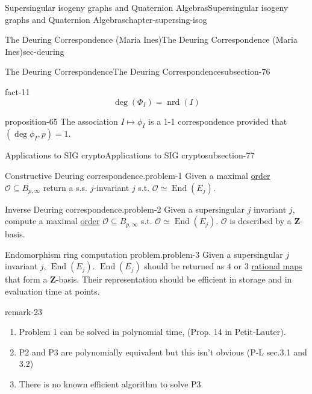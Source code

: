 \documentclass[oneside,10pt,]{book}
\numberwithin{equation}{section}
\newcommand{\ZZ}{\mathbf{Z}}
\newcommand{\ints}{\mathcal{O}}
\DeclareMathOperator{\End}{End}
\begin{document}
\begin{chapterptx}{Supersingular isogeny graphs and Quaternion Algebras}{}{Supersingular isogeny graphs and Quaternion Algebras}{}{}{chapter-supersing-isog}
\begin{sectionptx}{The Deuring Correspondence (Maria Ines)}{}{The Deuring Correspondence (Maria Ines)}{}{}{sec-deuring}
\begin{subsectionptx}{The Deuring Correspondence}{}{The Deuring Correspondence}{}{}{subsection-76}
\begin{fact}{}{}{fact-11}%
\hypertarget{p-970}{}%
%
\begin{equation*}
\deg (\Phi_I)  = \operatorname{nrd}(I)
\end{equation*}
%
\end{fact}
\begin{proposition}{}{}{proposition-65}%
\hypertarget{p-971}{}%
The association \(I \mapsto \phi_I\) is a 1-1 correspondence provided that \((\deg \phi_I, p) = 1\).%
\end{proposition}
\end{subsectionptx}
%
%
\typeout{************************************************}
\typeout{************************************************}
%
\begin{subsectionptx}{Applications to SIG crypto}{}{Applications to SIG crypto}{}{}{subsection-77}
\begin{problem}{Constructive Deuring correspondence.}{problem-1}%
\hypertarget{p-972}{}%
Given a maximal \hyperref[def-order-quaternion]{order} \(\ints \subseteq B_{p,\infty}\) return a s.s. \(j\)-invariant \(j\) s.t. \(\ints \simeq \End(E_j)\).%
\end{problem}
\begin{problem}{Inverse Deuring correspondence.}{problem-2}%
\hypertarget{p-973}{}%
Given a supersingular \(j\) invariant \(j\), compute a maximal \hyperref[def-order-quaternion]{order} \(\ints \subseteq B_{p,\infty}\)  s.t. \(\ints \simeq \End(E_j)\). \(\ints\) is described by a \(\ZZ\)-basis.%
\end{problem}
\begin{problem}{Endomorphism ring computation problem.}{problem-3}%
\hypertarget{p-974}{}%
Given a supersingular \(j\) invariant \(j\), \(\End(E_j)\). \(\End(E_j)\) should be returned as \(4\) or \(3\) \hyperref[def-rational-map]{rational maps} that form a \(\ZZ\)-basis. Their representation should be efficient in storage and in evaluation time at points.%
\end{problem}
\begin{remark}{}{remark-23}%
\hypertarget{p-975}{}%
\leavevmode%
\begin{enumerate}
\item\hypertarget{li-240}{}Problem 1 can be solved in polynomial time, (Prop. 14 in Petit-Lauter).%
\item\hypertarget{li-241}{}P2 and P3 are polynomially equivalent but this isn't obvious (P-L sec.3.1 and 3.2)%
\item\hypertarget{li-242}{}There is no known efficient algorithm to solve P3.%

\end{enumerate}
\end{remark}
\end{subsectionptx}
\end{sectionptx}
\end{chapterptx}
\end{document}
